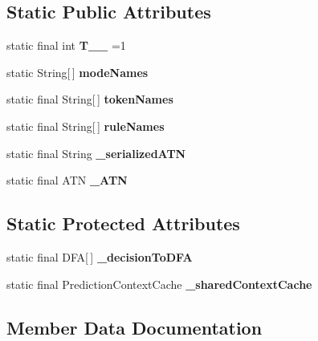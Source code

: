 \subsection*{Static Public Attributes}
\begin{DoxyCompactItemize}
\item 
\hypertarget{classedu_1_1udel_1_1cis_1_1vsl_1_1civl_1_1run_1_1common_1_1CommandLexer_ad4679be1e01081ff4b85431395f52030}{}static final int {\bfseries T\+\_\+\+\_} =1\label{classedu_1_1udel_1_1cis_1_1vsl_1_1civl_1_1run_1_1common_1_1CommandLexer_ad4679be1e01081ff4b85431395f52030}

\item 
static String\mbox{[}$\,$\mbox{]} {\bfseries mode\+Names}
\item 
static final String\mbox{[}$\,$\mbox{]} {\bfseries token\+Names}
\item 
static final String\mbox{[}$\,$\mbox{]} {\bfseries rule\+Names}
\item 
\hypertarget{classedu_1_1udel_1_1cis_1_1vsl_1_1civl_1_1run_1_1common_1_1CommandLexer_a6ccfc3be3106d510d385ee7be38d074c}{}static final String {\bfseries \+\_\+serialized\+A\+T\+N}\label{classedu_1_1udel_1_1cis_1_1vsl_1_1civl_1_1run_1_1common_1_1CommandLexer_a6ccfc3be3106d510d385ee7be38d074c}

\item 
static final A\+T\+N {\bfseries \+\_\+\+A\+T\+N}
\end{DoxyCompactItemize}
\subsection*{Static Protected Attributes}
\begin{DoxyCompactItemize}
\item 
\hypertarget{classedu_1_1udel_1_1cis_1_1vsl_1_1civl_1_1run_1_1common_1_1CommandLexer_a85576571780696f9da69185a38c6514a}{}static final D\+F\+A\mbox{[}$\,$\mbox{]} {\bfseries \+\_\+decision\+To\+D\+F\+A}\label{classedu_1_1udel_1_1cis_1_1vsl_1_1civl_1_1run_1_1common_1_1CommandLexer_a85576571780696f9da69185a38c6514a}

\item 
static final Prediction\+Context\+Cache {\bfseries \+\_\+shared\+Context\+Cache}
\end{DoxyCompactItemize}


\subsection{Member Data Documentation}
\hypertarget{classedu_1_1udel_1_1cis_1_1vsl_1_1civl_1_1run_1_1common_1_1CommandLexer_a21693aff18f91aef74c61b123e127710}{}
